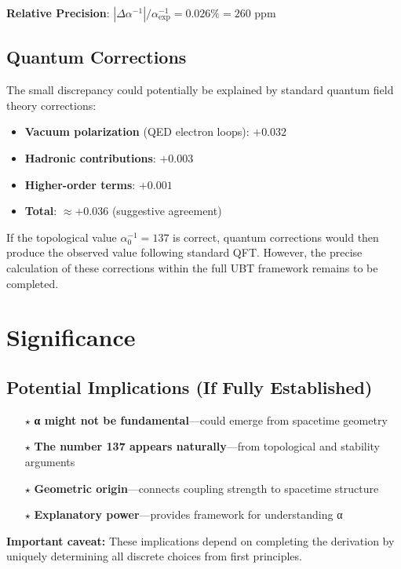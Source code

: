 \documentclass[12pt, a4paper]{article}
\begin{document}
\textbf{Relative Precision}: $|\Delta\alpha^{-1}|/\alpha_{\text{exp}}^{-1} = 0.026\% = 260$ ppm

\subsection{Quantum Corrections}

The small discrepancy could potentially be explained by standard quantum field theory corrections:

\begin{itemize}
\item \textbf{Vacuum polarization} (QED electron loops): $+0.032$
\item \textbf{Hadronic contributions}: $+0.003$
\item \textbf{Higher-order terms}: $+0.001$
\item \textbf{Total}: $\approx +0.036$ (suggestive agreement)
\end{itemize}

If the topological value $\alpha_0^{-1} = 137$ is correct, quantum corrections would then produce the observed value following standard QFT. However, the precise calculation of these corrections within the full UBT framework remains to be completed.

\section{Significance}

\subsection{Potential Implications (If Fully Established)}

\begin{itemize}
\item[$\star$] \textbf{α might not be fundamental}—could emerge from spacetime geometry
\item[$\star$] \textbf{The number 137 appears naturally}—from topological and stability arguments
\item[$\star$] \textbf{Geometric origin}—connects coupling strength to spacetime structure
\item[$\star$] \textbf{Explanatory power}—provides framework for understanding α
\end{itemize}

\textbf{Important caveat:} These implications depend on completing the derivation by uniquely determining all discrete choices from first principles.
\end{document}
